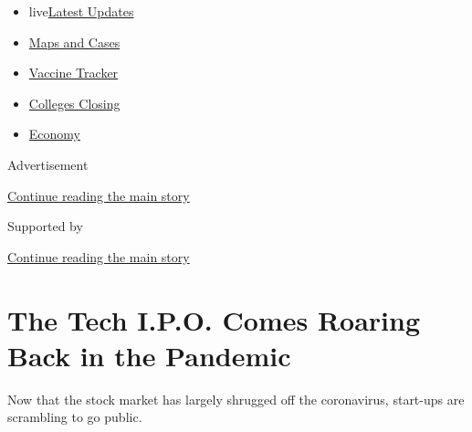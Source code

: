 \begin{itemize}
\tightlist
\item
  live\href{https://www.nytimes3xbfgragh.onion/2020/08/20/world/coronavirus-covid.html?name=styln-coronavirus-markets\&region=TOP_BANNER\&variant=undefined\&block=storyline_menu_recirc\&action=click\&pgtype=Article\&impression_id=222b6941-e384-11ea-ae40-4d2b82b5584d}{Latest
  Updates}
\item
  \href{https://www.nytimes3xbfgragh.onion/interactive/2020/us/coronavirus-us-cases.html?name=styln-coronavirus-markets\&region=TOP_BANNER\&variant=undefined\&block=storyline_menu_recirc\&action=click\&pgtype=Article\&impression_id=222b6942-e384-11ea-ae40-4d2b82b5584d}{Maps
  and Cases}
\item
  \href{https://www.nytimes3xbfgragh.onion/interactive/2020/science/coronavirus-vaccine-tracker.html?name=styln-coronavirus-markets\&region=TOP_BANNER\&variant=undefined\&block=storyline_menu_recirc\&action=click\&pgtype=Article\&impression_id=222b6943-e384-11ea-ae40-4d2b82b5584d}{Vaccine
  Tracker}
\item
  \href{https://www.nytimes3xbfgragh.onion/2020/08/19/us/colleges-closing-covid.html?name=styln-coronavirus-markets\&region=TOP_BANNER\&variant=undefined\&block=storyline_menu_recirc\&action=click\&pgtype=Article\&impression_id=222b6944-e384-11ea-ae40-4d2b82b5584d}{Colleges
  Closing}
\item
  \href{https://www.nytimes3xbfgragh.onion/live/2020/08/20/business/stock-market-today-coronavirus?name=styln-coronavirus-markets\&region=TOP_BANNER\&variant=undefined\&block=storyline_menu_recirc\&action=click\&pgtype=Article\&impression_id=222b9050-e384-11ea-ae40-4d2b82b5584d}{Economy}
\end{itemize}

Advertisement

\protect\hyperlink{after-top}{Continue reading the main story}

Supported by

\protect\hyperlink{after-sponsor}{Continue reading the main story}

\hypertarget{the-tech-ipo-comes-roaring-back-in-the-pandemic}{%
\section{The Tech I.P.O. Comes Roaring Back in the
Pandemic}\label{the-tech-ipo-comes-roaring-back-in-the-pandemic}}

Now that the stock market has largely shrugged off the coronavirus,
start-ups are scrambling to go public.

